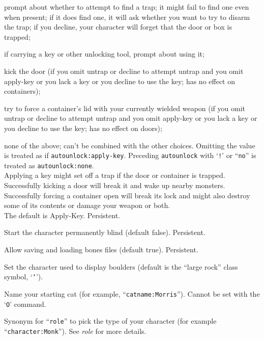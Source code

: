 \newlength{\auwidth}
\settowidth{\auwidth}{\tt Apply-Key}
\addtolength{\auwidth}{\labelsep}
\blist{\leftmargin \auwidth \topsep 1mm \itemsep 0mm}
\item[{\tt Untrap}]
prompt about whether to attempt to find a trap;
it might fail to find one even when present; if it does find one, it
will ask whether you want to try to disarm the trap; if you decline,
your character will forget that the door or box is trapped;
\item[{\tt Apply-Key}]
if carrying a key or other unlocking tool, prompt about using it;
\item[{\tt Kick}]
kick the door (if you omit untrap or decline to attempt untrap and
you omit apply-key or you lack a key or you decline to use the key;
has no effect on containers);
\item[{\tt Force}]
try to force a container's lid with your currently
wielded weapon (if you omit untrap or decline to attempt untrap and
you omit apply-key or you lack a key or you decline to use the key;
has no effect on doors);
\item[{\tt None}]
none of the above; can't be combined with the other choices.
\elist
Omitting the value is treated as if {\tt autounlock:apply-key}.
Preceding {\tt autounlock} with `{\tt !}' or ``{\tt no}'' is treated as
{\tt autounlock:none}.
\\
Applying a key might set off a trap if the door or container is trapped.
Successfully kicking a door will break it and wake up nearby monsters.
Successfully forcing a container open will break its lock and might also
destroy some of its contents or damage your weapon or both.
\\
The default is Apply-Key.
Persistent.
\item[\ib{blind}]
Start the character permanently blind (default false).  Persistent.
\item[\ib{bones}]
Allow saving and loading bones files (default true).  Persistent.
\item[\ib{boulder}]
Set the character used to display boulders (default is the ``large rock''
class symbol, `{\tt `}').
\item[\ib{catname}]
Name your starting cat (for example, ``{\tt catname:Morris}'').
Cannot be set with the `{\tt O}' command.
\item[\ib{character}]
Synonym for ``{\tt role}'' to pick the type of your character
(for example ``{\tt character:Monk}'').  See {\it role\/} for more details.
